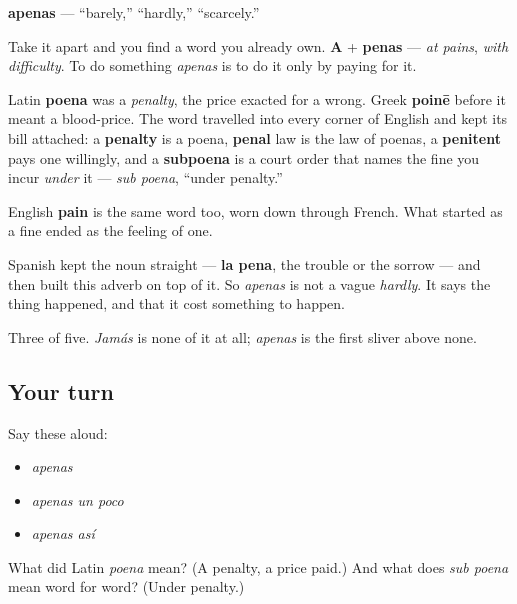 \begin{cousinweb}
\textbf{apenas} — \textquotedblleft{}barely,\textquotedblright{} \textquotedblleft{}hardly,\textquotedblright{} \textquotedblleft{}scarcely.\textquotedblright{}

Take it apart and you find a word you already own. \textbf{A} + \textbf{penas} — \emph{at pains}, \emph{with difficulty}. To do something \emph{apenas} is to do it only by paying for it.

Latin \textbf{poena} was a \emph{penalty}, the price exacted for a wrong. Greek \textbf{poinē} before it meant a blood-price. The word travelled into every corner of English and kept its bill attached: a \textbf{penalty} is a poena, \textbf{penal} law is the law of poenas, a \textbf{penitent} pays one willingly, and a \textbf{subpoena} is a court order that names the fine you incur \emph{under} it — \emph{sub poena}, \textquotedblleft{}under penalty.\textquotedblright{}

English \textbf{pain} is the same word too, worn down through French. What started as a fine ended as the feeling of one.

Spanish kept the noun straight — \textbf{la pena}, the trouble or the sorrow — and then built this adverb on top of it. So \emph{apenas} is not a vague \emph{hardly}. It says the thing happened, and that it cost something to happen.
\end{cousinweb}

\begin{grammarlens}[title={What you've built}]
Three of five. \emph{Jamás} is none of it at all; \emph{apenas} is the first sliver above none.
\end{grammarlens}

\subsection*{Your turn}
Say these aloud:

\begin{itemize}
\raggedright
  \item \emph{apenas}
  \item \emph{apenas un poco}
  \item \emph{apenas así}
\end{itemize}

\begin{tcolorbox}[breakable,colback=teal!4,colframe=teal!35!black,title={Before you move on}]
What did Latin \emph{poena} mean? (A penalty, a price paid.) And what does \emph{sub poena} mean word for word? (Under penalty.)
\end{tcolorbox}
